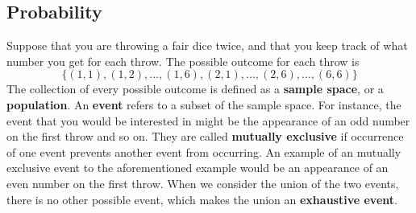 \documentclass[12pt]{article}
\theoremstyle{definition}
\theoremstyle{property}
\theoremstyle{assumption}
\theoremstyle{example}
\theoremstyle{comment}
\begin{document}
\subsection{Probability}
Suppose that you are throwing a fair dice twice, and that you keep track of what number you get for each throw. The possible outcome for each throw is
\[
\{(1,1),(1,2),...,(1,6),(2,1),...,(2,6),...,(6,6)\}
\]
The collection of every possible outcome is defined as a \textbf{sample space}, or a \textbf{population}. An \textbf{event} refers to a subset of the sample space. For instance, the event that you would be interested in might be the appearance of an odd number on the first throw and so on. They are called \textbf{mutually exclusive} if occurrence of one event prevents another event from occurring. An example of an mutually exclusive event to the aforementioned example would be an appearance of an even number on the first throw. When we consider the union of the two events, there is no other possible event, which makes the union an \textbf{exhaustive event}. \par\medskip\medskip
\end{document}

